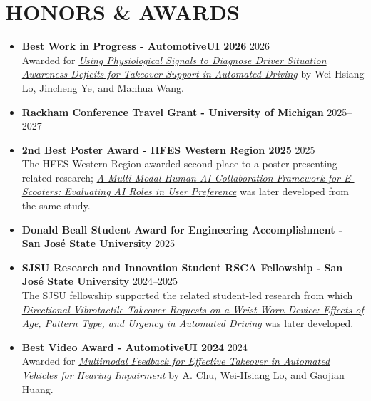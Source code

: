 \documentclass[11pt]{article}
\begin{document}
\vspace{0.6em}

\section*{HONORS \& AWARDS}
\begin{itemize}[leftmargin=*, topsep=0pt, itemsep=6pt]
  \item \textbf{Best Work in Progress - AutomotiveUI 2026} \hfill 2026\\
  Awarded for \href{https://lnkd.in/e_ExkqBx}{\textit{Using Physiological Signals to Diagnose Driver Situation Awareness Deficits for Takeover Support in Automated Driving}} by Wei-Hsiang Lo, Jincheng Ye, and Manhua Wang.

  \item \textbf{Rackham Conference Travel Grant - University of Michigan} \hfill 2025--2027

  \item \textbf{2nd Best Poster Award - HFES Western Region 2025} \hfill 2025\\
  The HFES Western Region awarded second place to a poster presenting related research; \href{https://journals.sagepub.com/doi/full/10.1177/10711813251360714}{\textit{A Multi-Modal Human-AI Collaboration Framework for E-Scooters: Evaluating AI Roles in User Preference}} was later developed from the same study.

  \item \textbf{Donald Beall Student Award for Engineering Accomplishment - San José State University} \hfill 2025

  \item \textbf{SJSU Research and Innovation Student RSCA Fellowship - San José State University} \hfill 2024--2025\\
  The SJSU fellowship supported the related student-led research from which \href{https://www.sciencedirect.com/science/article/pii/S0001457525001794}{\textit{Directional Vibrotactile Takeover Requests on a Wrist-Worn Device: Effects of Age, Pattern Type, and Urgency in Automated Driving}} was later developed.

  \item \textbf{Best Video Award - AutomotiveUI 2024} \hfill 2024\\
  Awarded for \href{https://doi.org/10.1145/3641308.3680515}{\textit{Multimodal Feedback for Effective Takeover in Automated Vehicles for Hearing Impairment}} by A. Chu, Wei-Hsiang Lo, and Gaojian Huang.
\end{itemize}
\end{document}
